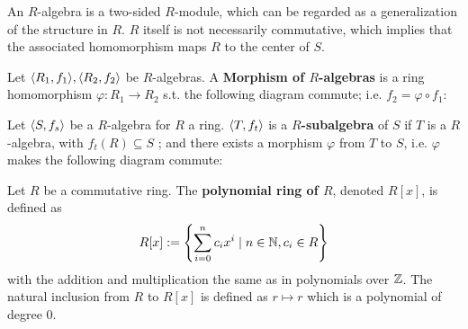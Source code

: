 \documentclass{article}
\begin{document}
\begin{remark}
    An $R$-algebra is a two-sided $R$-module, which can be regarded as a generalization of the structure in $R$. $R$ itself is not necessarily commutative, which implies that the associated homomorphism maps $R$ to the center of $S$.
\end{remark}

\begin{definition}
    Let $\langle R_1, f_1 \rangle, \langle R_2, f_2 \rangle$ be $R$-algebras. A \textbf{Morphism of $R$-algebras} is a ring homomorphism $\varphi: R_1 \to R_2$ s.t. the following diagram commute; i.e. $f_2 = \varphi \circ f_1$:
    \begin{figure}[htbp]
        \centering    
    \end{figure}
\end{definition}

\begin{definition}[$R$-subalgebra]
    Let $\langle S, f_s \rangle$ be a $R$-algebra for $R$ a ring. $\langle T, f_t \rangle$ is a \textbf{$R$-subalgebra} of $S$ if $T$ is a $R$-algebra, with $f_t(R) \subseteq S$ ; and there exists a morphism $\varphi$ from $T$ to $S$, i.e. $\varphi$ makes the following diagram commute:
    \begin{figure}[htbp]
        \centering    
    \end{figure}
\end{definition}

\begin{definition}
    Let $R$ be a commutative ring. The \textbf{polynomial ring of $R$}, denoted $R[x]$, is defined as
    $$
        R[x] := \left\{ \sum\limits_{i=0}^{n} c_i x^i \mid n\in\mathbb{N}, c_i\in R \right\}
    $$
    with the addition and multiplication the same as in polynomials over $\mathbb{Z}$. The natural inclusion from $R$ to $R[x]$ is defined as $r\mapsto r$ which is a polynomial of degree 0.
\end{definition}
\end{document}
